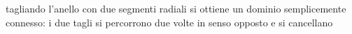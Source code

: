 \documentclass[preview]{standalone}
\begin{document}
\begin{center}
tagliando l'anello con due segmenti radiali si ottiene un dominio semplicemente connesso: i due tagli si percorrono due volte in senso opposto e si cancellano
\end{center}
\end{document}
